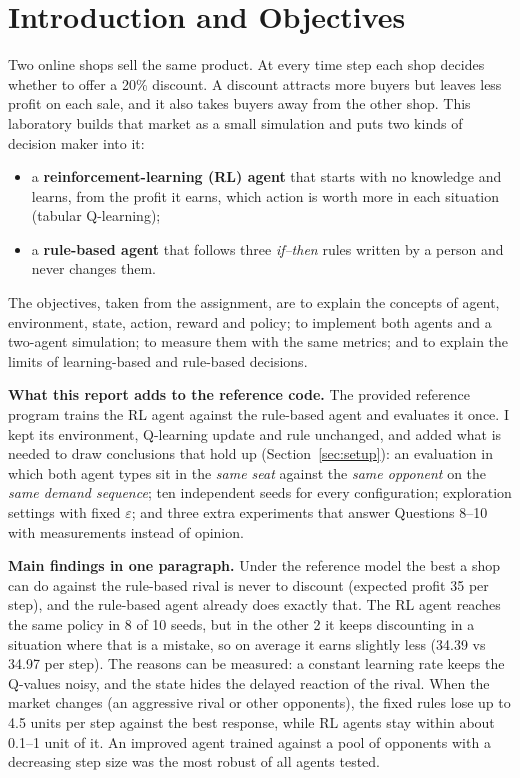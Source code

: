 \documentclass[11pt, a4paper]{article}
\begin{document}
\section{Introduction and Objectives}

Two online shops sell the same product. At every time step each shop decides whether to offer a 20\% discount. A discount attracts more buyers but leaves less profit on each sale, and it also takes buyers away from the other shop. This laboratory builds that market as a small simulation and puts two kinds of decision maker into it:

\begin{itemize}
    \item a \textbf{reinforcement-learning (RL) agent} that starts with no knowledge and learns, from the profit it earns, which action is worth more in each situation (tabular Q-learning);
    \item a \textbf{rule-based agent} that follows three \emph{if--then} rules written by a person and never changes them.
\end{itemize}

The objectives, taken from the assignment, are to explain the concepts of agent, environment, state, action, reward and policy; to implement both agents and a two-agent simulation; to measure them with the same metrics; and to explain the limits of learning-based and rule-based decisions.

\textbf{What this report adds to the reference code.} The provided reference program trains the RL agent against the rule-based agent and evaluates it once. I kept its environment, Q-learning update and rule unchanged, and added what is needed to draw conclusions that hold up (Section~\ref{sec:setup}): an evaluation in which both agent types sit in the \emph{same seat} against the \emph{same opponent} on the \emph{same demand sequence}; ten independent seeds for every configuration; exploration settings with fixed $\varepsilon$; and three extra experiments that answer Questions 8--10 with measurements instead of opinion.

\textbf{Main findings in one paragraph.} Under the reference model the best a shop can do against the rule-based rival is never to discount (expected profit 35 per step), and the rule-based agent already does exactly that. The RL agent reaches the same policy in 8 of 10 seeds, but in the other 2 it keeps discounting in a situation where that is a mistake, so on average it earns slightly less (34.39 vs 34.97 per step). The reasons can be measured: a constant learning rate keeps the Q-values noisy, and the state hides the delayed reaction of the rival. When the market changes (an aggressive rival or other opponents), the fixed rules lose up to 4.5 units per step against the best response, while RL agents stay within about 0.1--1 unit of it. An improved agent trained against a pool of opponents with a decreasing step size was the most robust of all agents tested.
\end{document}
